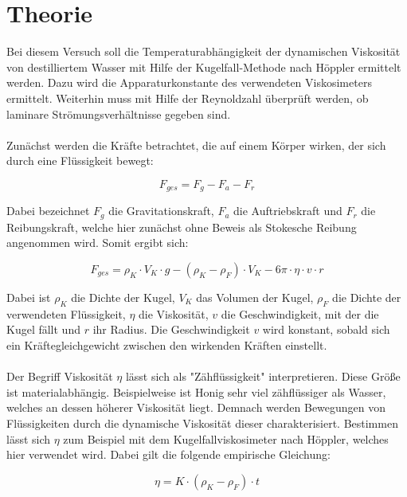 \section{Theorie}
\label{sec:Theorie}

Bei diesem Versuch soll die Temperaturabhängigkeit der dynamischen 
Viskosität von destilliertem Wasser mit Hilfe der Kugelfall-Methode nach 
Höppler ermittelt werden. Dazu wird die Apparaturkonstante des 
verwendeten Viskosimeters ermittelt. Weiterhin muss mit Hilfe der 
Reynoldzahl überprüft werden, ob laminare Strömungsverhältnisse gegeben 
sind. \\
\\Zunächst werden die Kräfte betrachtet, die auf einem Körper wirken, der
sich durch eine Flüssigkeit bewegt: 

\begin{equation}
F_{ges} = F_g - F_a - F_r
\end{equation}

Dabei bezeichnet $F_g$ die Gravitationskraft, $F_a$ die Auftriebskraft und 
$F_r$ die Reibungskraft, welche hier zunächst ohne Beweis als Stokesche 
Reibung angenommen wird. Somit ergibt sich: 

\begin{equation}
F_{ges} = \rho _K\cdot V_K\cdot g - (\rho _K - \rho _F)\cdot V_K - 6\pi\cdot \eta \cdot v\cdot r
\end{equation}

Dabei ist $\rho _K$ die Dichte der Kugel, $V_K$ das Volumen der Kugel, 
$\rho _F$ die Dichte der verwendeten Flüssigkeit, $\eta$ die Viskosität, 
$v$ die Geschwindigkeit, mit der die Kugel fällt und $r$ ihr Radius. 
Die Geschwindigkeit $v$ wird konstant, sobald sich ein Kräftegleichgewicht 
zwischen den wirkenden Kräften einstellt. \\
\\Der Begriff Viskosität $\eta$ lässt sich als "Zähflüssigkeit" interpretieren.
Diese Größe ist materialabhängig. Beispielweise ist Honig sehr viel zähflüssiger als Wasser,
welches an dessen höherer Viskosität liegt. 
Demnach werden Bewegungen von Flüssigkeiten durch die dynamische Viskosität dieser 
charakterisiert. 
Bestimmen lässt sich $\eta$ zum Beispiel mit dem Kugelfallviskosimeter nach 
Höppler, welches hier verwendet wird. Dabei gilt die folgende empirische Gleichung: 

\begin{equation}
\eta = K\cdot (\rho _K - \rho _F)\cdot t
\label{eqn:Viskosität}
\end{equation}

